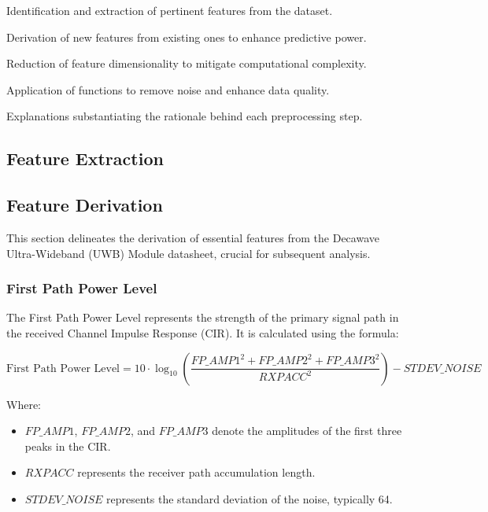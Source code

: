 \documentclass[
	a4paper, %
	11pt, %
]{CSUniSchoolLabReport}
\begin{document}
\begin{description}[style=nextline]
    \item[Feature Extraction:] Identification and extraction of pertinent features from the dataset.
    \item[Feature Derivation:] Derivation of new features from existing ones to enhance predictive power.
    \item[Feature Reduction:] Reduction of feature dimensionality to mitigate computational complexity.
    \item[De-Noise Functions:] Application of functions to remove noise and enhance data quality.
    \item[Justifications of Processes:] Explanations substantiating the rationale behind each preprocessing step.
\end{description}

\subsection{Feature Extraction}\label{feature_extraction}


\subsection{Feature Derivation}\label{feature_derivation}

This section delineates the derivation of essential features from the Decawave Ultra-Wideband (UWB) Module datasheet, crucial for subsequent analysis.

\subsubsection{First Path Power Level}\label{first_path_power_level}

The First Path Power Level represents the strength of the primary signal path in the received Channel Impulse Response (CIR). It is calculated using the formula:

\[
\text{First Path Power Level} = 10 \cdot \log_{10}\left(\frac{{FP\_AMP1^2 + FP\_AMP2^2 + FP\_AMP3^2}}{{RXPACC^2}}\right) - STDEV\_NOISE  %
\]

Where:
\begin{itemize}
    \item $FP\_AMP1$, $FP\_AMP2$, and $FP\_AMP3$ denote the amplitudes of the first three peaks in the CIR.
    \item $RXPACC$ represents the receiver path accumulation length.
    \item $STDEV\_NOISE$ represents the standard deviation of the noise, typically 64.
\end{itemize}
\end{document}
